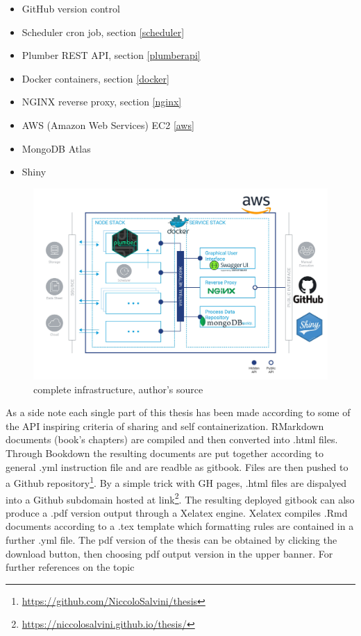 \documentclass[
  12pt,
  a4paper,
  oneside]{book}
\DeclareRobustCommand{\href}[2]{#2\footnote{\url{#1}}}
\providecommand{\tightlist}{%
  \setlength{\itemsep}{0pt}\setlength{\parskip}{0pt}}
\theoremstyle{definition}
\theoremstyle{definition}
\theoremstyle{definition}
\theoremstyle{remark}
\begin{document}
\begin{itemize}
\tightlist
\item
  GitHub version control
\item
  Scheduler cron job, section \ref{scheduler}
\item
  Plumber REST API, section \ref{plumberapi}
\item
  Docker containers, section \ref{docker}
\item
  NGINX reverse proxy, section \ref{nginx}
\item
  AWS (Amazon Web Services) EC2 \ref{aws}
\item
  MongoDB Atlas
\item
  Shiny
\end{itemize}

\begin{figure}
\centering
\includegraphics{images/tot_infra.jpg}
\caption{\label{fig:CompleteStructure}complete infrastructure, author's source}
\end{figure}

As a side note each single part of this thesis has been made according to some of the API inspiring criteria of sharing and self containerization. RMarkdown \citep{rmarkdown1} documents (book's chapters) are compiled and then converted into .html files. Through Bookdown \citep{bookdown2} the resulting documents are put together according to general .yml instruction file and are readble as gitbook.
Files are then pushed to a \href{https://github.com/NiccoloSalvini/thesis}{Github repository}. By a simple trick with GH pages, .html files are dispalyed into a Github subdomain hosted at \href{https://niccolosalvini.github.io/thesis/}{link}. The resulting deployed gitbook can also produce a .pdf version output through a Xelatex engine. Xelatex compiles .Rmd documents according to a .tex template which formatting rules are contained in a further .yml file. The pdf version of the thesis can be obtained by clicking the download button, then choosing pdf output version in the upper banner. For further references on the topic \citet{bookdown2}
\end{document}

